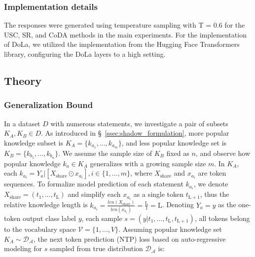 \subsubsection{Implementation details}
The responses were generated using temperature sampling with T = 0.6 for the USC, SR, and CoDA methods in the main experiments. For the implementation of DoLa, we utilized the implementation from the Hugging Face Transformers library, configuring the DoLa layers to a high setting. 




\subsection{Theory}
\label{ssec:theory}
\subsubsection{Generalization Bound}
In a dataset $D$ with numerous statements, we investigate a pair of subsets $K_A, K_B \in D$.
As introduced in \S~\ref{ssec:shadow_formulation}, more popular knowledge subset is $K_A=\{k_{a_1}, ..., k_{a_m}\}$, and less popular knowledge set is $K_B=\{k_{b_1}, ..., k_{b_n}\}$. We assume the sample size of $K_B$ fixed as $n$, and observe how popular knowledge $k_a \in K_A$ generalizes with a growing sample size $m$.  
In $K_A$, each $k_{a_i} = Y_a | [X_{\mathrm{share}}\odot x_{a_i}], i\in\{1, ..., m\}$, where $X_\mathrm{share}$ and $x_{a_i}$ are token sequences. 
To formalize model prediction of each statement $k_{a_i}$, we denote $X_\mathrm{share}=(t_1, ...,t_\text{L})$ and simplify each $x_{a_i}$ as a single token $t_{\text{L}+1}$, thus the relative knowledge length is $k_{a_i}=\frac{len(X_\mathrm{share})}{len(x_{a_i})}=\frac{\text{L}}{1}=\text{L}$. Denoting $Y_a=y$ as the one-token output class label $y$, each sample $s=(y|t_1, ..., t_\text{L}, t_{\text{L}+1})$, all tokens belong to the vocabulary space $\mathcal{V}=\{1, ..., V\}$. 
Assuming popular knowledge set $K_A\sim\mathcal{D_A}$, the next token prediction (NTP) loss based on auto-regressive modeling for $s$ sampled from true distribution $\mathcal{D_A}$ is:

